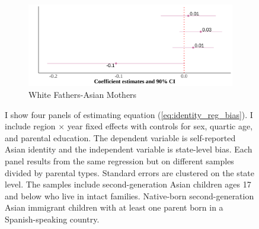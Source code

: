 \begin{center}
\begin{figure}[!htb]
\begin{subfigure}{.48\textwidth}
\caption{White Fathers-Asian Mothers}
\centering
\includegraphics[width=.9\linewidth]{figure/by-parents-regs-wh.png}
\end{subfigure}
\caption*{\footnotesize{I show four panels of estimating equation (\ref{eq:identity_reg_bias}). I include region $\times$ year fixed effects with controls for sex, quartic age, and parental education. The dependent variable is self-reported Asian identity and the independent variable is state-level bias. Each panel results from the same regression but on different samples divided by parental types. Standard errors are clustered on the state level. The samples include second-generation Asian children ages 17 and below who live in intact families. Native-born second-generation Asian immigrant children with at least one parent born in a Spanish-speaking country.}}
\end{figure}
\end{center}

\pagebreak
\newpage



\pagebreak
\newpage



\pagebreak
\newpage



\pagebreak
\newpage


\pagebreak
\newpage

\clearpage
